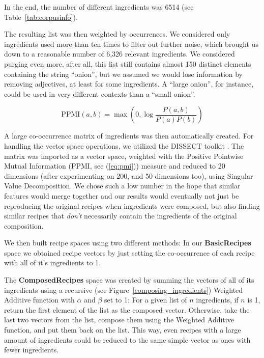 In the end, the number of different ingredients was 6514 (see Table~\ref{tab:corpusinfo}).

The resulting list was then weighted by occurrences. We considered only ingredients used more than ten times to filter out further noise, which brought us down to a reasonable number of 6,326 relevant ingredients. We considered purging even more, after all, this list still contains almost 150 distinct elements containing the string ``onion'', but we assumed we would lose information by removing adjectives, at least for some ingredients. A ``large onion'', for instance, could be used in very different contexts than a ``small onion''.

\begin{equation} \label{eq:pmi}
    \mathrm{PPMI}(a,b) = \max\left(0,\log{\frac{P(a,b)}{P(a) P(b)}}\right)
\end{equation}

A large co-occurrence matrix of ingredients was then automatically created. For handling the vector space operations, we utilized the DISSECT toolkit \citep{Dissect}. The matrix was imported as a vector space, weighted with the Positive Pointwise Mutual Information (PPMI, see (\ref{eq:pmi})) measure and reduced to 20 dimensions (after experimenting on 200, and 50 dimensions too), using Singular Value Decomposition. We chose such a low number in the hope that similar features would merge together and our results would eventually not just be reproducing the original recipes when ingredients were composed, but also finding similar recipes that \textit{don't} necessarily contain the ingredients of the original composition.

We then built recipe spaces using two different methods: In our \textbf{BasicRecipes} space we obtained recipe vectors by just setting the co-occurrence of each recipe with all of it's ingredients to 1.

The \textbf{ComposedRecipes} space was created by summing the vectors of all of its ingredients using a recursive (see Figure~\ref{composing_ingredients}) Weighted Additive function \citep{Mitchell:Lapata:2010} with $\alpha$ and $\beta$ set to 1: For a given list of $n$ ingredients, if $n$ is 1, return the first element of the list as the composed vector. Otherwise, take the last two vectors from the list, compose them using the Weighted Additive function, and put them back on the list. This way, even recipes with a large amount of ingredients could be reduced to the same simple vector as ones with fewer ingredients.
